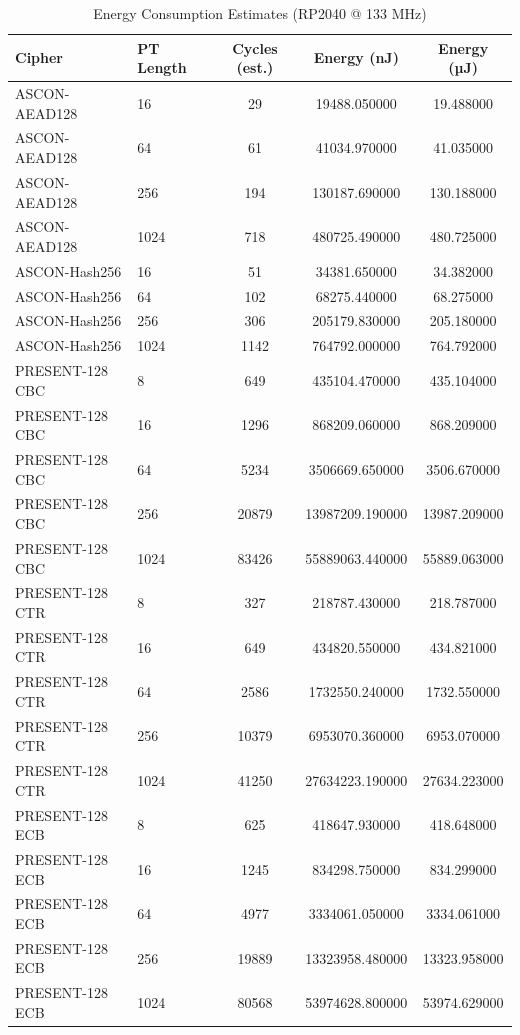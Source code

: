 \begin{table}
\caption{Energy Consumption Estimates (RP2040 @ 133 MHz)}
\label{tab:energy}
\begin{tabular}{@{}llccc@{}}
\toprule
Cipher & PT Length & Cycles (est.) & Energy (nJ) & Energy (µJ) \\
\midrule
ASCON-AEAD128 & 16 & 29 & 19488.050000 & 19.488000 \\
ASCON-AEAD128 & 64 & 61 & 41034.970000 & 41.035000 \\
ASCON-AEAD128 & 256 & 194 & 130187.690000 & 130.188000 \\
ASCON-AEAD128 & 1024 & 718 & 480725.490000 & 480.725000 \\
ASCON-Hash256 & 16 & 51 & 34381.650000 & 34.382000 \\
ASCON-Hash256 & 64 & 102 & 68275.440000 & 68.275000 \\
ASCON-Hash256 & 256 & 306 & 205179.830000 & 205.180000 \\
ASCON-Hash256 & 1024 & 1142 & 764792.000000 & 764.792000 \\
PRESENT-128 CBC & 8 & 649 & 435104.470000 & 435.104000 \\
PRESENT-128 CBC & 16 & 1296 & 868209.060000 & 868.209000 \\
PRESENT-128 CBC & 64 & 5234 & 3506669.650000 & 3506.670000 \\
PRESENT-128 CBC & 256 & 20879 & 13987209.190000 & 13987.209000 \\
PRESENT-128 CBC & 1024 & 83426 & 55889063.440000 & 55889.063000 \\
PRESENT-128 CTR & 8 & 327 & 218787.430000 & 218.787000 \\
PRESENT-128 CTR & 16 & 649 & 434820.550000 & 434.821000 \\
PRESENT-128 CTR & 64 & 2586 & 1732550.240000 & 1732.550000 \\
PRESENT-128 CTR & 256 & 10379 & 6953070.360000 & 6953.070000 \\
PRESENT-128 CTR & 1024 & 41250 & 27634223.190000 & 27634.223000 \\
PRESENT-128 ECB & 8 & 625 & 418647.930000 & 418.648000 \\
PRESENT-128 ECB & 16 & 1245 & 834298.750000 & 834.299000 \\
PRESENT-128 ECB & 64 & 4977 & 3334061.050000 & 3334.061000 \\
PRESENT-128 ECB & 256 & 19889 & 13323958.480000 & 13323.958000 \\
PRESENT-128 ECB & 1024 & 80568 & 53974628.800000 & 53974.629000 \\

\end{tabular}
\end{table}
